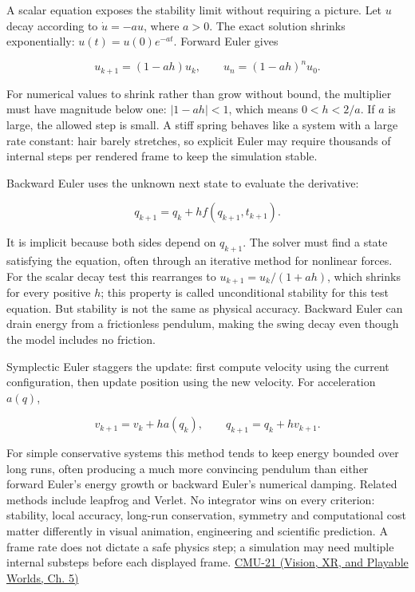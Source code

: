 A scalar equation exposes the stability limit without requiring a picture. Let \(u\) decay according to \(\dot u=-a u\), where \(a>0\). The exact solution shrinks exponentially: \(u(t)=u(0)e^{-at}\). Forward Euler gives

\[
u_{k+1}=(1-ah)u_k,
\qquad
u_n=(1-ah)^n u_0.
\]

For numerical values to shrink rather than grow without bound, the multiplier must have magnitude below one: \(|1-ah|<1\), which means \(0<h<2/a\). If \(a\) is large, the allowed step is small. A stiff spring behaves like a system with a large rate constant: hair barely stretches, so explicit Euler may require thousands of internal steps per rendered frame to keep the simulation stable.

Backward Euler uses the unknown next state to evaluate the derivative:

\[
q_{k+1}=q_k+h f(q_{k+1},t_{k+1}).
\]

It is implicit because both sides depend on \(q_{k+1}\). The solver must find a state satisfying the equation, often through an iterative method for nonlinear forces. For the scalar decay test this rearranges to \(u_{k+1}=u_k/(1+ah)\), which shrinks for every positive \(h\); this property is called unconditional stability for this test equation. But stability is not the same as physical accuracy. Backward Euler can drain energy from a frictionless pendulum, making the swing decay even though the model includes no friction.

Symplectic Euler staggers the update: first compute velocity using the current configuration, then update position using the new velocity. For acceleration \(a(q)\),

\[
v_{k+1}=v_k+h a(q_k),\qquad q_{k+1}=q_k+h v_{k+1}.
\]

For simple conservative systems this method tends to keep energy bounded over long runs, often producing a much more convincing pendulum than either forward Euler's energy growth or backward Euler's numerical damping. Related methods include leapfrog and Verlet. No integrator wins on every criterion: stability, local accuracy, long-run conservation, symmetry and computational cost matter differently in visual animation, engineering and scientific prediction. A frame rate does not dictate a safe physics step; a simulation may need multiple internal substeps before each displayed frame. \href{../07-Vision-XR-and-Playable-Worlds/main.pdf\#nameddest=04-visual-computing-ii-ch036-cmu-21---dynamics-and-time-integration}{CMU-21 (Vision, XR, and Playable Worlds, Ch. 5)}

